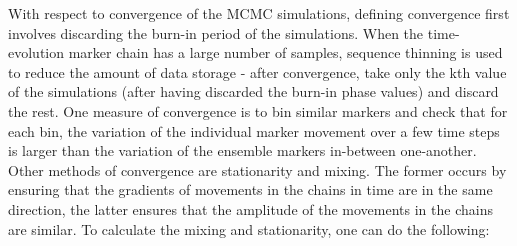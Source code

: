 \documentclass[
]{article}
\begin{document}
With respect to convergence of the MCMC simulations, defining convergence first involves discarding the burn-in period of the simulations. When the time-evolution marker chain has a large number of samples, sequence thinning is used to reduce the amount of data storage - after convergence, take only the kth value of the simulations (after having discarded the burn-in phase values) and discard the rest. One measure of convergence is to bin similar markers and check that for each bin, the variation of the individual marker movement over a few time steps is larger than the variation of the ensemble markers in-between one-another. Other methods of convergence are stationarity and mixing. The former occurs by ensuring that the gradients of movements in the chains in time are in the same direction, the latter ensures that the amplitude of the movements in the chains are similar. To calculate the mixing and stationarity, one can do the following:
\end{document}
